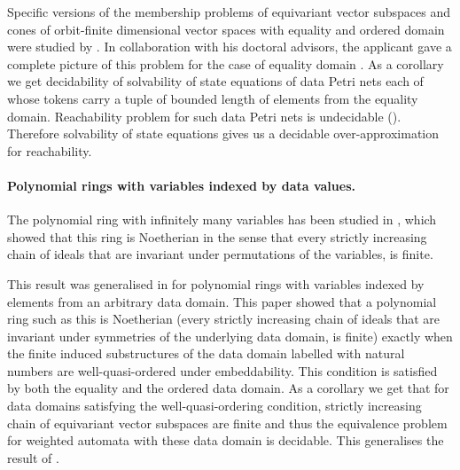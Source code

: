 \documentclass[a4paper,11pt]{article}
\begin{document}
Specific versions of the membership problems of equivariant vector subspaces and cones of orbit-finite dimensional vector spaces with equality and ordered domain were studied by \cite{HLT17,HL18,HR22}.
In collaboration with his doctoral advisors, the applicant gave a complete picture of this problem for the case of equality domain
.
%
%
As a corollary we get decidability of solvability of state equations of data Petri nets each of whose tokens carry a tuple of bounded length of elements from the equality domain.
Reachability problem for such data Petri nets is undecidable (\cite{Las16}).
Therefore solvability of state equations gives us a decidable over-approximation for reachability.
%
\paragraph*{Polynomial rings with variables indexed by data values.}
%
%
%
The polynomial ring with infinitely many variables has been studied in \cite{Cohen67},
which showed that this ring is Noetherian in the sense that every strictly increasing chain of ideals that are invariant under permutations of the variables, is finite.

This result was generalised in  for polynomial rings with variables indexed by elements from an arbitrary data domain.
This paper showed that a polynomial ring such as this is Noetherian
(every strictly increasing chain of ideals that are invariant under symmetries of the underlying data domain, is finite)
exactly when the finite induced substructures of the data domain labelled with natural numbers are well-quasi-ordered under embeddability.
This condition is satisfied by both the equality and the ordered data domain.
As a corollary we get that for data domains satisfying the well-quasi-ordering condition,
strictly increasing chain of equivariant vector subspaces are finite and thus the equivalence problem for weighted automata with these data domain is decidable.
This generalises the result of \cite{BKM21}.
\end{document}
